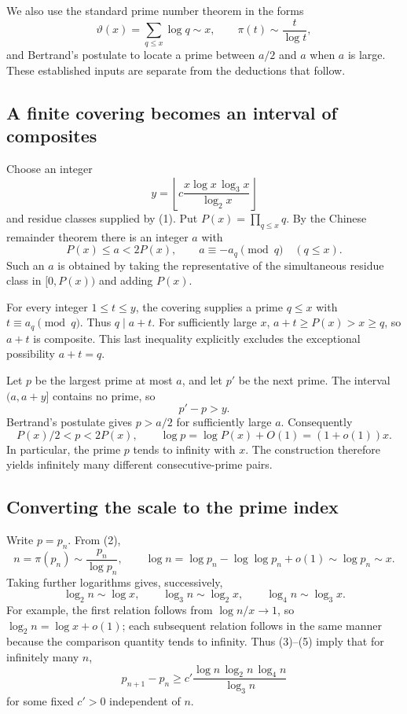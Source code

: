 We also use the standard prime number theorem in the forms
\[
 \vartheta(x)=\sum_{q\le x}\log q\sim x,
 \qquad \pi(t)\sim\frac t{\log t},
\tag{2}
\]
and Bertrand's postulate to locate a prime between $a/2$ and $a$ when $a$ is large. These established inputs are separate from the deductions that follow.

\subsection{A finite covering becomes an interval of composites}
Choose an integer
\[
 y=\left\lfloor c\frac{x\log x\,\log_3x}{\log_2x}\right\rfloor
\]
and residue classes supplied by (1). Put $P(x)=\prod_{q\le x}q$. By the Chinese remainder theorem there is an integer $a$ with
\[
 P(x)\le a<2P(x),\qquad a\equiv-a_q\pmod q\quad(q\le x).
\]
Such an $a$ is obtained by taking the representative of the simultaneous residue class in $[0,P(x))$ and adding $P(x)$.

For every integer $1\le t\le y$, the covering supplies a prime $q\le x$ with $t\equiv a_q\pmod q$. Thus $q\mid a+t$. For sufficiently large $x$, $a+t\ge P(x)>x\ge q$, so $a+t$ is composite. This last inequality explicitly excludes the exceptional possibility $a+t=q$.

Let $p$ be the largest prime at most $a$, and let $p'$ be the next prime. The interval $(a,a+y]$ contains no prime, so
\[
 p'-p>y.
\tag{3}
\]
Bertrand's postulate gives $p>a/2$ for sufficiently large $a$. Consequently
\[
 P(x)/2<p<2P(x),\qquad
 \log p=\log P(x)+O(1)=(1+o(1))x.
\tag{4}
\]
In particular, the prime $p$ tends to infinity with $x$. The construction therefore yields infinitely many different consecutive-prime pairs.

\subsection{Converting the scale to the prime index}
Write $p=p_n$. From (2),
\[
 n=\pi(p_n)\sim\frac{p_n}{\log p_n},\qquad
 \log n=\log p_n-\log\log p_n+o(1)\sim\log p_n\sim x.
\]
Taking further logarithms gives, successively,
\[
 \log_2n\sim\log x,\qquad
 \log_3n\sim\log_2x,\qquad
 \log_4n\sim\log_3x.
\tag{5}
\]
For example, the first relation follows from $\log n/x\to1$, so $\log_2n=\log x+o(1)$; each subsequent relation follows in the same manner because the comparison quantity tends to infinity. Thus (3)--(5) imply that for infinitely many $n$,
\[
 p_{n+1}-p_n\ge c'\frac{\log n\,\log_2n\,\log_4n}{\log_3n}
\tag{6}
\]
for some fixed $c'>0$ independent of $n$.

